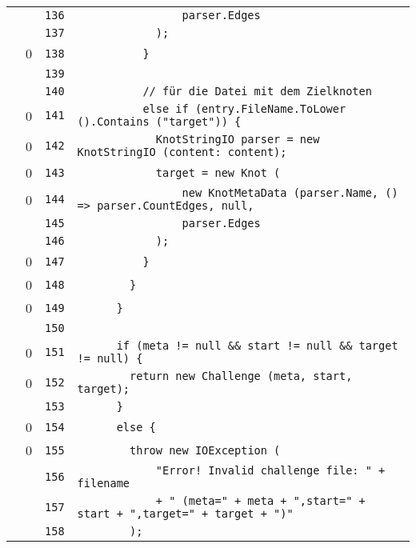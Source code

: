 \documentclass[a4paper,10pt]{article}
\begin{document}
\begin{longtable}[l]{lrrl}
\cellcolor{gray} &  & \verb~136~ & \verb~                parser.Edges~\\
\cellcolor{gray} &  & \verb~137~ & \verb~            );~\\
\cellcolor{red} & 0 & \verb~138~ & \verb~          }~\\
\cellcolor{gray} &  & \verb~139~ & \verb~~\\
\cellcolor{gray} &  & \verb~140~ & \verb~          // für die Datei mit dem Zielknoten~\\
\cellcolor{red} & 0 & \verb~141~ & \verb~          else if (entry.FileName.ToLower ().Contains ("target")) {~\\
\cellcolor{red} & 0 & \verb~142~ & \verb~            KnotStringIO parser = new KnotStringIO (content: content);~\\
\cellcolor{red} & 0 & \verb~143~ & \verb~            target = new Knot (~\\
\cellcolor{red} & 0 & \verb~144~ & \verb~                new KnotMetaData (parser.Name, () => parser.CountEdges, null, ~\\
\cellcolor{gray} &  & \verb~145~ & \verb~                parser.Edges~\\
\cellcolor{gray} &  & \verb~146~ & \verb~            );~\\
\cellcolor{red} & 0 & \verb~147~ & \verb~          }~\\
\cellcolor{red} & 0 & \verb~148~ & \verb~        }~\\
\cellcolor{red} & 0 & \verb~149~ & \verb~      }~\\
\cellcolor{gray} &  & \verb~150~ & \verb~~\\
\cellcolor{red} & 0 & \verb~151~ & \verb~      if (meta != null && start != null && target != null) {~\\
\cellcolor{red} & 0 & \verb~152~ & \verb~        return new Challenge (meta, start, target);~\\
\cellcolor{gray} &  & \verb~153~ & \verb~      }~\\
\cellcolor{red} & 0 & \verb~154~ & \verb~      else {~\\
\cellcolor{red} & 0 & \verb~155~ & \verb~        throw new IOException (~\\
\cellcolor{gray} &  & \verb~156~ & \verb~            "Error! Invalid challenge file: " + filename~\\
\cellcolor{gray} &  & \verb~157~ & \verb~            + " (meta=" + meta + ",start=" + start + ",target=" + target + ")"~\\
\cellcolor{gray} &  & \verb~158~ & \verb~        );~\\

\end{longtable}
\end{document}
